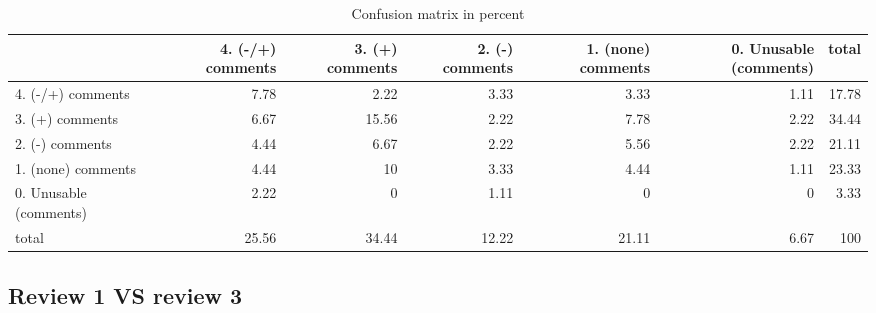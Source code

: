 \documentclass{article}
\begin{document}
\begin{table}[H]

\centering

\begin{tabular}{lrrrrrr}
\hline
                        &   4. (-/+) comments &   3. (+) comments &   2. (-) comments &   1. (none) comments &   0. Unusable (comments) &   total \\
\hline
 4. (-/+) comments      &                7.78 &              2.22 &              3.33 &                 3.33 &                     1.11 &   17.78 \\
 3. (+) comments        &                6.67 &             15.56 &              2.22 &                 7.78 &                     2.22 &   34.44 \\
 2. (-) comments        &                4.44 &              6.67 &              2.22 &                 5.56 &                     2.22 &   21.11 \\
 1. (none) comments     &                4.44 &             10    &              3.33 &                 4.44 &                     1.11 &   23.33 \\
 0. Unusable (comments) &                2.22 &              0    &              1.11 &                 0    &                     0    &    3.33 \\
 total                  &               25.56 &             34.44 &             12.22 &                21.11 &                     6.67 &  100    \\
\hline
\end{tabular}\caption{Confusion matrix in percent}

\end{table}



\subsection{Review 1 VS review 3} 
\end{document}
